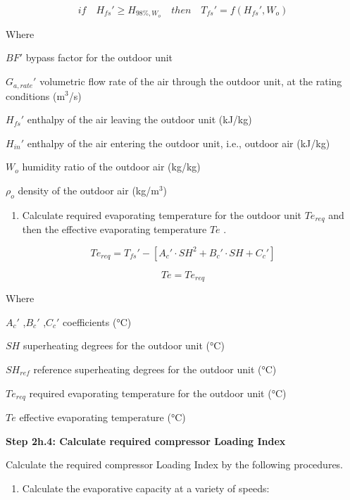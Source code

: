 \begin{equation}
if\quad{H_{fs}}'\ge{H_{98\%,W_o}}\quad{then}\quad{T_{fs}}' = f({H_{fs}}',W_o)
\end{equation}

Where

\(BF'\) bypass factor for the outdoor unit

\({G_{a,rate}}'\) volumetric flow rate of the air through the outdoor unit, at the rating conditions (m\(^{3}\)/s)

\({H_{fs}}'\) enthalpy of the air leaving the outdoor unit (kJ/kg)

\({H_{in}}'\) enthalpy of the air entering the outdoor unit, i.e., outdoor air (kJ/kg)

\(W_o\) humidity ratio of the outdoor air (kg/kg)

\(\rho_o\) density of the outdoor air (kg/m\(^{3}\))

\begin{enumerate}
\def\labelenumi{(\arabic{enumi})}
\setcounter{enumi}{1}
\tightlist
\item
  Calculate required evaporating temperature for the outdoor unit \(Te_{req}\) and then the effective evaporating temperature \(Te\) .
\end{enumerate}

\begin{equation}
Te_{req} = {T_{fs}}'-[{A_c}'\cdot SH^2+{B_c}'\cdot SH+{C_c}']
\end{equation}

\begin{equation}
Te = Te_{req}
\end{equation}

Where

\({A_c}'\) ,\({B_c}'\) ,\({C_c}'\) coefficients (°C)

\(SH\) superheating degrees for the outdoor unit (°C)

\(SH_{ref}\) reference superheating degrees for the outdoor unit (°C)

\(Te_{req}\) required evaporating temperature for the outdoor unit (°C)

\(Te\) effective evaporating temperature (°C)

\textbf{Step 2h.4: Calculate required compressor Loading Index}

Calculate the required compressor Loading Index by the following procedures.

\begin{enumerate}
\def\labelenumi{\alph{enumi}.}
\tightlist
\item
  Calculate the evaporative capacity at a variety of speeds:
\end{enumerate}

